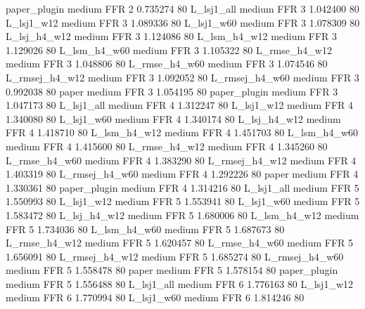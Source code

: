   paper_plugin     medium      FFR                 2 0.735274 80
    L_lsj1_all     medium      FFR                 3 1.042400 80
    L_lsj1_w12     medium      FFR                 3 1.089336 80
    L_lsj1_w60     medium      FFR                 3 1.078309 80
  L_lsj_h4_w12     medium      FFR                 3 1.124086 80
  L_lsm_h4_w12     medium      FFR                 3 1.129026 80
  L_lsm_h4_w60     medium      FFR                 3 1.105322 80
 L_rmse_h4_w12     medium      FFR                 3 1.048806 80
 L_rmse_h4_w60     medium      FFR                 3 1.074546 80
L_rmsej_h4_w12     medium      FFR                 3 1.092052 80
L_rmsej_h4_w60     medium      FFR                 3 0.992038 80
         paper     medium      FFR                 3 1.054195 80
  paper_plugin     medium      FFR                 3 1.047173 80
    L_lsj1_all     medium      FFR                 4 1.312247 80
    L_lsj1_w12     medium      FFR                 4 1.340080 80
    L_lsj1_w60     medium      FFR                 4 1.340174 80
  L_lsj_h4_w12     medium      FFR                 4 1.418710 80
  L_lsm_h4_w12     medium      FFR                 4 1.451703 80
  L_lsm_h4_w60     medium      FFR                 4 1.415600 80
 L_rmse_h4_w12     medium      FFR                 4 1.345260 80
 L_rmse_h4_w60     medium      FFR                 4 1.383290 80
L_rmsej_h4_w12     medium      FFR                 4 1.403319 80
L_rmsej_h4_w60     medium      FFR                 4 1.292226 80
         paper     medium      FFR                 4 1.330361 80
  paper_plugin     medium      FFR                 4 1.314216 80
    L_lsj1_all     medium      FFR                 5 1.550993 80
    L_lsj1_w12     medium      FFR                 5 1.553941 80
    L_lsj1_w60     medium      FFR                 5 1.583472 80
  L_lsj_h4_w12     medium      FFR                 5 1.680006 80
  L_lsm_h4_w12     medium      FFR                 5 1.734036 80
  L_lsm_h4_w60     medium      FFR                 5 1.687673 80
 L_rmse_h4_w12     medium      FFR                 5 1.620457 80
 L_rmse_h4_w60     medium      FFR                 5 1.656091 80
L_rmsej_h4_w12     medium      FFR                 5 1.685274 80
L_rmsej_h4_w60     medium      FFR                 5 1.558478 80
         paper     medium      FFR                 5 1.578154 80
  paper_plugin     medium      FFR                 5 1.556488 80
    L_lsj1_all     medium      FFR                 6 1.776163 80
    L_lsj1_w12     medium      FFR                 6 1.770994 80
    L_lsj1_w60     medium      FFR                 6 1.814246 80
